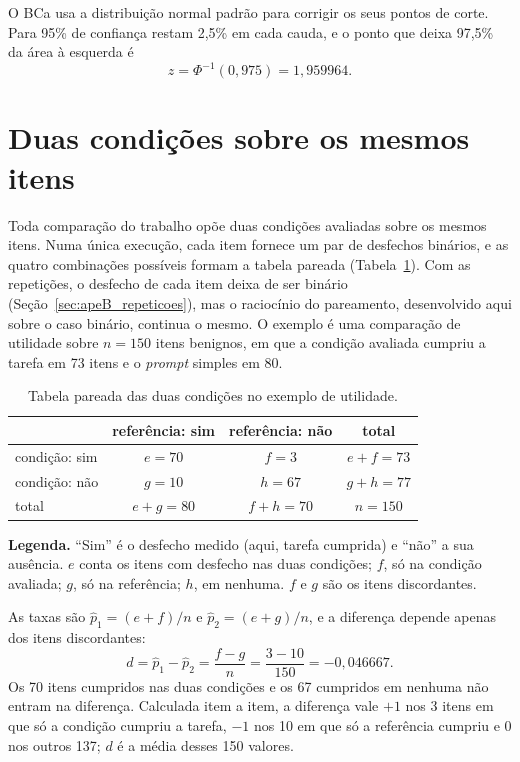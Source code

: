 O BCa usa a distribuição normal padrão para corrigir os seus pontos de corte.
Para 95\% de confiança restam 2,5\% em cada cauda, e o ponto que deixa
97,5\% da área à esquerda é
\begin{equation}
z = \Phi^{-1}(0{,}975) = 1{,}959964.
\label{eq:apeB_z}
\end{equation}

\section{Duas condições sobre os mesmos itens}\label{sec:apeB_pareada}

Toda comparação do trabalho opõe duas condições avaliadas sobre os mesmos
itens. Numa única execução, cada item fornece um par de desfechos binários,
e as quatro combinações possíveis formam a tabela pareada
(Tabela~\ref{tab:apeB_pareada}). Com as repetições, o desfecho de cada item
deixa de ser binário (Seção~\ref{sec:apeB_repeticoes}), mas o raciocínio do
pareamento, desenvolvido aqui sobre o caso binário, continua o mesmo. O
exemplo é uma comparação de utilidade sobre $n = 150$ itens benignos, em que
a condição avaliada cumpriu a tarefa em 73 itens e o \textit{prompt} simples
em 80.

\begin{table}[H]
\centering
\caption{Tabela pareada das duas condições no exemplo de utilidade.}
\label{tab:apeB_pareada}
\begin{tabular}{lccc}
\toprule
 & referência: sim & referência: não & total \\
\midrule
condição: sim & $e = 70$ & $f = 3$ & $e + f = 73$ \\
condição: não & $g = 10$ & $h = 67$ & $g + h = 77$ \\
\midrule
total & $e + g = 80$ & $f + h = 70$ & $n = 150$ \\
\bottomrule
\end{tabular}
\vspace{2pt}
\begin{minipage}{\textwidth}
\footnotesize\raggedright
\textbf{Legenda.} ``Sim'' é o desfecho medido (aqui, tarefa cumprida) e
``não'' a sua ausência. $e$ conta os itens com desfecho nas duas condições;
$f$, só na condição avaliada; $g$, só na referência; $h$, em nenhuma. $f$ e
$g$ são os itens discordantes.
\end{minipage}
\end{table}

As taxas são $\hat p_1 = (e+f)/n$ e $\hat p_2 = (e+g)/n$, e a diferença
depende apenas dos itens discordantes:
\begin{equation}
d = \hat p_1 - \hat p_2 = \frac{f - g}{n} = \frac{3 - 10}{150} = -0{,}046667.
\label{eq:apeB_d}
\end{equation}
Os 70 itens cumpridos nas duas condições e os 67 cumpridos em nenhuma não
entram na diferença. Calculada item a item, a diferença vale $+1$ nos 3 itens
em que só a condição cumpriu a tarefa, $-1$ nos 10 em que só a referência
cumpriu e 0 nos outros 137; $d$ é a média desses 150 valores.

